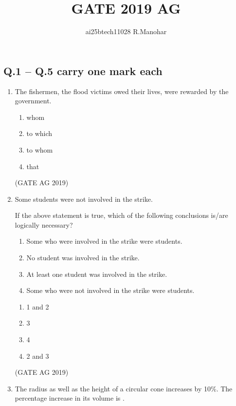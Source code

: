 \documentclass[journal,12pt,onecolumn]{IEEEtran}
\title{GATE 2019 AG}
\author{ai25btech11028 R.Manohar}
\theoremstyle{remark}
\begin{document}
\maketitle

\subsection*{\textbf{Q.1 -- Q.5 carry one mark each}}

\begin{enumerate}
\item The fishermen, \underline{\hspace{1cm}} the flood victims owed their lives, were rewarded by the government.

\begin{multicols}{4}
\begin{enumerate}
\item whom
\item to which
\item to whom
\item that
\end{enumerate}
\end{multicols}
\hfill{(GATE AG 2019)}

\item Some students were not involved in the strike. 

If the above statement is true, which of the following conclusions is/are logically necessary? 

\begin{enumerate}
\item[1.] Some who were involved in the strike were students.  
\item[2.] No student was involved in the strike.  
\item[3.] At least one student was involved in the strike.  
\item[4.] Some who were not involved in the strike were students.  
\end{enumerate}


\begin{multicols}{4}
\begin{enumerate}
\item 1 and 2
\item 3
\item 4
\item 2 and 3
\end{enumerate}
\end{multicols}
\hfill{(GATE AG 2019)}

\item The radius as well as the height of a circular cone increases by 10\%.  
The percentage increase in its volume is \underline{\hspace{1cm}}.




\end{enumerate}
\end{document}
